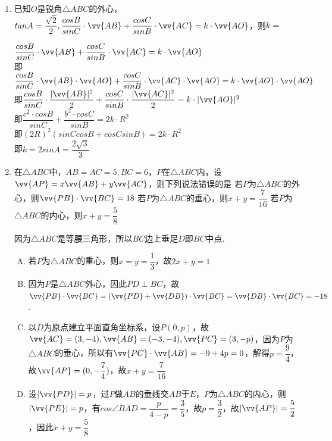 \begin{enumerate}
\begin{enumerate}
        \item 已知$O$是锐角$\triangle ABC$的外心，$tanA = \dfrac{\sqrt{2}}{2}, \dfrac{cosB}{sinC} \cdot \vv{AB} + \dfrac{cosC}{sinB} \cdot \vv{AC} = k \cdot \vv{AO}$，则$k = $
        \begin{jieda}
            $\dfrac{cosB}{sinC} \cdot \vv{AB} + \dfrac{cosC}{sinB} \cdot \vv{AC} = k \cdot \vv{AO}$\\
            即$\dfrac{cosB}{sinC} \cdot \vv{AB} \cdot \vv{AO} + \dfrac{cosC}{sinB} \cdot \vv{AC} \cdot \vv{AO} = k \cdot \vv{AO} \cdot \vv{AO}$\\
            即$\dfrac{cosB}{sinC} \cdot \dfrac{|\vv{AB}|^2}{2} + \dfrac{cosC}{sinB} \cdot \dfrac{|\vv{AC}|^2}{2} = k \cdot |\vv{AO}|^2$\\
            即$\dfrac{c^2 \cdot cosB}{sinC}+ \dfrac{b^2 \cdot cosC}{sinB} = 2k \cdot R^2$ \\
            即$(2R)^2(sinCcosB+cosCsinB) = 2k\cdot R^2$\\
            即$k = 2sinA = \dfrac{2\sqrt{3}}{3}$
        \end{jieda}
        \item 在$\triangle ABC$中，$AB = AC = 5, BC = 6$，$P$在$\triangle ABC$内，设$\vv{AP} = x\vv{AB} + y \vv{AC}$，则下列说法错误的是
        {若$P$为$\triangle ABC$的外心，则$\vv{PB} \cdot \vv{BC} = 18$}
        {若$P$为$\triangle ABC$的垂心，则$x+y = \dfrac{7}{16}$}
        {若$P$为$\triangle ABC$的内心，则$x+y = \dfrac{5}{8}$}
        \begin{jieda}
            因为$\triangle ABC$是等腰三角形，所以$BC$边上垂足$D$即$BC$中点.
            \begin{enumerate}[A.]
                \item 若$P$为$\triangle ABC$的重心，则$x = y = \dfrac{1}{3}$，故$2x+y = 1$
                \item 因为$P$是$\triangle ABC$外心，因此$PD \perp BC$，故$\vv{PB} \cdot \vv{BC} = (\vv{PD} + \vv{DB}) \cdot \vv{BC} = \vv{DB} \cdot \vv{BC}  = -18$.
                \item 以$D$为原点建立平面直角坐标系，设$P(0, p)$，故$\vv{AC} = (3, -4), \vv{AB} = (-3, -4), \vv{PC} = (3, -p)$，因为$P$为$\triangle ABC$的垂心，所以有$\vv{PC} \cdot \vv{AB} = -9 + 4p = 0$，解得$p = \dfrac{9}{4}$，故$\vv{AP} = (0, -\dfrac{7}{4})$，故$x+y = \dfrac{7}{16}$
                \item 设$|\vv{PD}| = p$，过$P$做$AB$的垂线交$AB$于$E$，$P$为$\triangle ABC$的内心，则$|\vv{PE}| = p$，有$cos\angle BAD = \dfrac{p}{4-p} = \dfrac{3}{5}$，故$p = \dfrac{3}{2}$，故$|\vv{AP}| = \dfrac{5}{2}$，因此$x + y = \dfrac{5}{8}$

\end{enumerate}
\end{jieda}
\end{enumerate}
\end{enumerate}
